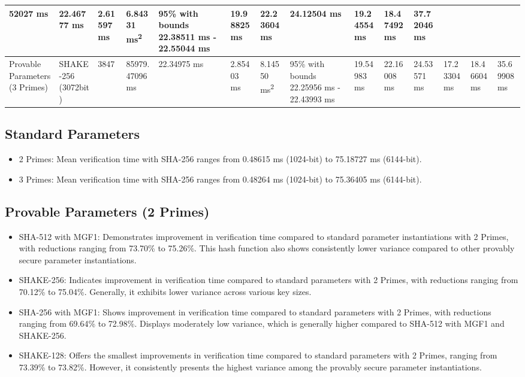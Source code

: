 \documentclass[]{final_report}
\theoremstyle{definition}
\begin{document}
\begin{landscape}
\begin{longtable}{|p{2.3cm}|p{1.8cm}|p{1.0cm}|p{1.7cm}|p{1.4cm}|p{1.5cm}|p{1.8cm}|p{1.5cm}|p{1.43cm}|p{1.5cm}|p{1.3cm}|p{1.4cm}|p{1.3cm}|p{1.37cm}|}
52027 ms & 22.46777 ms & 2.61597 ms & 6.84331 ms\textsuperscript{2} & 95\% with bounds 22.38511 ms - 22.55044 ms & 19.98825 ms & 22.23604 ms & 24.12504 ms & 19.24554 ms & 18.47492 ms & 37.72046 ms \\
\hline
Provable Parameters (3 Primes) & SHAKE-256 (3072bit) & 3847 & 85979.
47096 ms & 22.34975 ms & 2.85403 ms & 8.14550 ms\textsuperscript{2} & 95\% with bounds 22.25956 ms - 22.43993 ms & 19.54983 ms & 22.16008 ms & 24.53571 ms & 17.23304 ms & 18.46604 ms & 35.69908 ms \\
\hline

\end{longtable}


\end{landscape}





\subsection*{Standard Parameters}
\begin{itemize}
\item 2 Primes: Mean verification time with SHA-256 ranges from 0.48615 ms (1024-bit) to 75.18727 ms (6144-bit).
\item 3 Primes: Mean verification time with SHA-256 ranges from 0.48264 ms (1024-bit) to 75.36405 ms (6144-bit).
\end{itemize}

\subsection*{Provable Parameters (2 Primes)}
\begin{itemize}
\item SHA-512 with MGF1: Demonstrates improvement in verification time compared to standard parameter instantiations with 2 Primes, with reductions ranging from 73.70\% to 75.26\%. This hash function also shows consistently lower variance compared to other provably secure parameter instantiations.
\item SHAKE-256: Indicates improvement in verification time compared to standard parameters with 2 Primes, with reductions ranging from 70.12\% to 75.04\%. Generally, it exhibits lower variance across various key sizes.
\item SHA-256 with MGF1: Shows improvement in verification time compared to standard parameters with 2 Primes, with reductions ranging from 69.64\% to 72.98\%. Displays moderately low variance, which is generally higher compared to SHA-512 with MGF1 and SHAKE-256.
\item SHAKE-128: Offers the smallest improvements in verification time compared to standard parameters with 2 Primes, ranging from 73.39\% to 73.82\%. However, it consistently presents the highest variance among the provably secure parameter instantiations.
\end{itemize}
\end{document}
